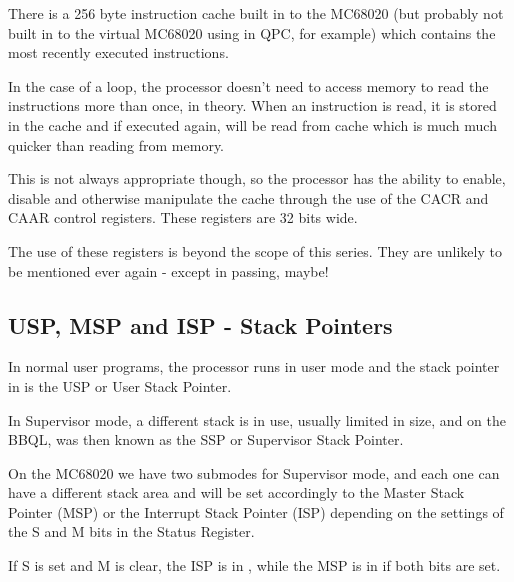 There is a 256 byte instruction cache built in to the MC68020 (but probably not built in to the virtual MC68020 using in QPC, for example) which contains the most recently executed instructions.

In the case of a loop, the processor doesn't need to access memory to read the instructions more than once, in theory. When an instruction is read, it is stored in the cache and if executed again, will be read from cache which is much much quicker than reading from memory.

This is not always appropriate though, so the processor has the ability to enable, disable and otherwise manipulate the cache through the use of the CACR and CAAR control registers. These registers are 32 bits wide.

The use of these registers is beyond the scope of this series. They are unlikely to be mentioned ever again - except in passing, maybe!

\subsection{USP, MSP and ISP - Stack Pointers}

In normal user programs, the processor runs in user mode and the stack pointer in  is the USP or User Stack Pointer.

In Supervisor mode, a different stack is in use, usually limited in size, and on the BBQL,  was then known as the SSP or Supervisor Stack Pointer.

On the MC68020 we have two submodes for Supervisor mode, and each one can have a different stack area and  will be set accordingly to the Master Stack Pointer (MSP) or the Interrupt Stack Pointer (ISP) depending on the settings of the S and M bits in the Status Register.

If S is set and M is clear, the ISP is in , while the MSP is in  if both bits are set.

